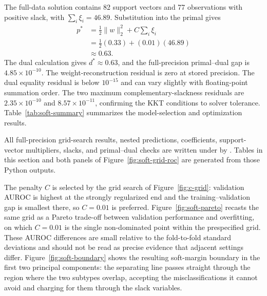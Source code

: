\documentclass[11pt,a4paper]{article}
\numberwithin{equation}{section} %
\begin{document}
The full-data solution contains 82 support vectors and 77 observations with
positive slack, with $\sum_i\xi_i=46.89$. Substitution into the primal gives
\begin{equation}
\begin{aligned}
p^*
&=\frac12\lVert w\rVert_2^2+C\sum_i\xi_i\\
&=\frac12(0.33)+(0.01)(46.89)\\
&\approx0.63.
\end{aligned}
\end{equation}
The dual calculation gives $d^*\approx0.63$, and the full-precision
primal--dual gap is $4.85\times10^{-10}$. The weight-reconstruction residual
is zero at stored precision. The dual equality residual is below $10^{-15}$ and
can vary slightly with floating-point summation order. The two maximum
complementary-slackness residuals are $2.35\times10^{-10}$ and
$8.57\times10^{-11}$, confirming the
KKT conditions to solver tolerance. Table~\ref{tab:soft-summary} summarizes
the model-selection and optimization results.

\begin{table}[H]
\centering
\caption{Soft-margin model-selection, validation, and optimization summary
for the prespecified seed-zero split.}
\label{tab:soft-summary}

\end{table}

All full-precision grid-search results, nested predictions, coefficients,
support-vector multipliers, slacks, and primal--dual checks are written under
 by . Tables in this
section and both panels of Figure~\ref{fig:soft-grid-roc} are generated from
those Python outputs.

The penalty $C$ is selected by the grid search of Figure~\ref{fig:c-grid}:
validation AUROC is highest at the strongly regularized end and the
training--validation gap is smallest there, so $C=0.01$ is preferred.
Figure~\ref{fig:soft-pareto} recasts the same grid as a Pareto trade-off
between validation performance and overfitting, on which $C=0.01$ is the single
non-dominated point within the prespecified grid. These AUROC differences are
small relative to the fold-to-fold standard deviations and should not be read
as precise evidence that adjacent settings differ. Figure~\ref{fig:soft-boundary} shows the resulting
soft-margin boundary in the first two principal components: the separating line
passes straight through the region where the two subtypes overlap, accepting
the misclassifications it cannot avoid and charging for them through the slack
variables.
\end{document}
